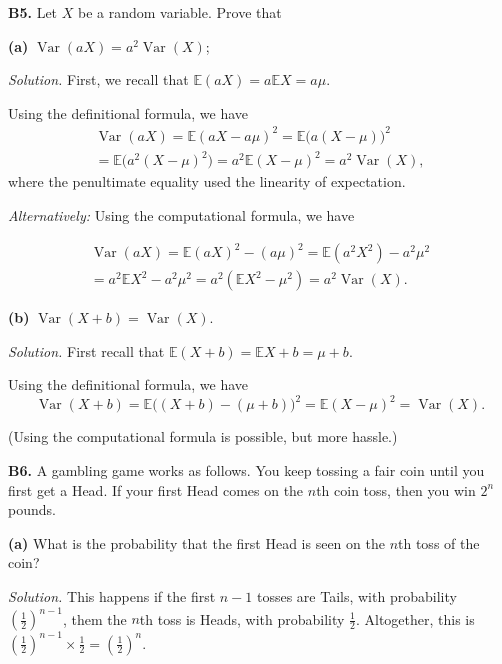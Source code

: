 \documentclass[
  a4paper,
]{book}
\theoremstyle{definition}
\theoremstyle{definition}
\theoremstyle{definition}
\theoremstyle{definition}
\theoremstyle{remark}
\begin{document}
\textbf{B5.} Let \(X\) be a random variable. Prove that

\textbf{(a)} \(\operatorname{Var}(aX) = a^2 \operatorname{Var}(X)\);

\begin{myanswers}
\emph{Solution.}
First, we recall that \(\mathbb E(aX) = a\mathbb EX = a\mu\).

Using the definitional formula, we have
\begin{multline}
\operatorname{Var}(aX) = \mathbb E(aX - a\mu)^2 = \mathbb E\big(a(X-\mu)\big)^2 \\
= \mathbb E \big(a^2(X-\mu)^2\big) = a^2 \mathbb E(X - \mu)^2 = a^2 \operatorname{Var}(X) ,
\end{multline}
where the penultimate equality used the linearity of expectation.

\emph{Alternatively:} Using the computational formula, we have

\begin{multline}
\operatorname{Var}(aX) = \mathbb E(aX)^2 - (a\mu)^2 = \mathbb E(a^2X^2) - a^2 \mu^2 \\
= a^2 \mathbb EX^2 - a^2\mu^2 = a^2 (\mathbb EX^2 - \mu^2) = a^2 \operatorname{Var}(X) .
\end{multline}

\end{myanswers}

\textbf{(b)} \(\operatorname{Var}(X+b) = \operatorname{Var}(X)\).

\begin{myanswers}
\emph{Solution.}
First recall that \(\mathbb E(X + b) = \mathbb EX + b = \mu + b\).

Using the definitional formula, we have
\[ \operatorname{Var}(X + b) = \mathbb E\big((X + b) - (\mu + b)\big)^2 = \mathbb E(X - \mu)^2 = \operatorname{Var}(X) . \]

(Using the computational formula is possible, but more hassle.)

\end{myanswers}

\textbf{B6.} A gambling game works as follows. You keep tossing a fair coin until you first get a Head. If your first Head comes on the \(n\)th coin toss, then you win \(2^n\) pounds.

\textbf{(a)} What is the probability that the first Head is seen on the \(n\)th toss of the coin?

\begin{myanswers}
\emph{Solution.}
This happens if the first \(n-1\) tosses are Tails, with probability \((\frac12)^{n-1}\), them the \(n\)th toss is Heads, with probability \(\frac12\). Altogether, this is \((\frac12)^{n-1}\times \frac12 = (\frac12)^n\).

\end{myanswers}
\end{document}
